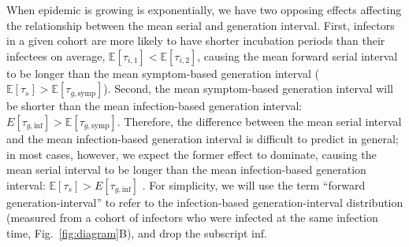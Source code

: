 \documentclass[12pt]{article}
\newcommand{\fref}[1]{Fig.~\ref{fig:#1}}
\begin{document}
When epidemic is growing is exponentially, we have two opposing effects affecting the relationship between the mean serial and generation interval.
First, infectors in a given cohort are more likely to have shorter incubation periods than their infectees on average, $\mathbb E[\tau_{i, 1}] < \mathbb E[\tau_{i, 2}]$, causing the mean forward serial interval to be longer than the mean symptom-based generation interval ($\mathbb E[\tau_s] > \mathbb E[\tau_{g, \mathrm{symp}}]$).
Second, the mean symptom-based generation interval will be shorter than the mean infection-based generation interval: $E[\tau_{g, \mathrm{inf}}] > \mathbb E[\tau_{g, \mathrm{symp}}]$.
Therefore, the difference between the mean serial interval and the mean infection-based generation interval is difficult to predict in general; in most cases, however, we expect the former effect to dominate, causing the mean serial interval to be longer than the mean infection-based generation interval: $\mathbb E[\tau_s] > E[\tau_{g, \mathrm{inf}}]$ \citep{park2021forward}.
For simplicity, we will use the term ``forward generation-interval'' to refer to the infection-based generation-interval distribution (measured from a cohort of infectors who were infected at the same infection time, \fref{diagram}B), and drop the subscript $\mathrm{inf}$.
\end{document}
